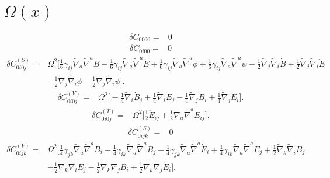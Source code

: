 \documentclass[10pt,letterpaper]{article}
\begin{document}
\section*{ $\Omega(x)$}
\begin{align}
\delta C_{0000}={}& 0
\end{align}
\begin{align}
\delta C_{0i00}={}& 0
\end{align}
\begin{align}
\delta C_{0i0j}^{(S)}={}&\Omega^2\bigg[\tfrac{1}{6} \gamma_{ij} \tilde{\nabla}_{a}\tilde{\nabla}^{a}\dot{B}
 -  \tfrac{1}{6} \gamma_{ij} \tilde{\nabla}_{a}\tilde{\nabla}^{a}\ddot{E}
 + \tfrac{1}{6} \gamma_{ij} \tilde{\nabla}_{a}\tilde{\nabla}^{a}\phi
 + \tfrac{1}{6} \gamma_{ij} \tilde{\nabla}_{a}\tilde{\nabla}^{a}\psi
 -  \tfrac{1}{2} \tilde{\nabla}_{j}\tilde{\nabla}_{i}\dot{B}
 + \tfrac{1}{2} \tilde{\nabla}_{j}\tilde{\nabla}_{i}\ddot{E}\nonumber\\
& -  \tfrac{1}{2} \tilde{\nabla}_{j}\tilde{\nabla}_{i}\phi
 -  \tfrac{1}{2} \tilde{\nabla}_{j}\tilde{\nabla}_{i}\psi\bigg].
\end{align}
\begin{align}
\delta C_{0i0j}^{(V)}={}&\Omega^2\bigg[- \tfrac{1}{4} \tilde{\nabla}_{i}\dot{B}_{j}
 + \tfrac{1}{4} \tilde{\nabla}_{i}\ddot{E}_{j}
 -  \tfrac{1}{4} \tilde{\nabla}_{j}\dot{B}_{i}
 + \tfrac{1}{4} \tilde{\nabla}_{j}\ddot{E}_{i}\bigg].
\end{align}
\begin{align}
\delta C_{0i0j}^{(T)}={}&\Omega^2\bigg[\tfrac{1}{2} \ddot{E}_{ij}
 + \tfrac{1}{2} \tilde{\nabla}_{a}\tilde{\nabla}^{a}E_{ij}\bigg].
\end{align}
\begin{align}
\delta C_{0ijk}^{(S)}={}& 0
\end{align}
\begin{align}
\delta C_{0ijk}^{(V)}={}&\Omega^2\bigg[\tfrac{1}{4} \gamma_{jk} \tilde{\nabla}_{a}\tilde{\nabla}^{a}B_{i}
 -  \tfrac{1}{4} \gamma_{ik} \tilde{\nabla}_{a}\tilde{\nabla}^{a}B_{j}
 -  \tfrac{1}{4} \gamma_{jk} \tilde{\nabla}_{a}\tilde{\nabla}^{a}\dot{E}_{i}
 + \tfrac{1}{4} \gamma_{ik} \tilde{\nabla}_{a}\tilde{\nabla}^{a}\dot{E}_{j}
 + \tfrac{1}{2} \tilde{\nabla}_{k}\tilde{\nabla}_{i}B_{j}\nonumber\\
& -  \tfrac{1}{2} \tilde{\nabla}_{k}\tilde{\nabla}_{i}\dot{E}_{j}
 -  \tfrac{1}{2} \tilde{\nabla}_{k}\tilde{\nabla}_{j}B_{i}
 + \tfrac{1}{2} \tilde{\nabla}_{k}\tilde{\nabla}_{j}\dot{E}_{i}\bigg].
\end{align}
\end{document}
